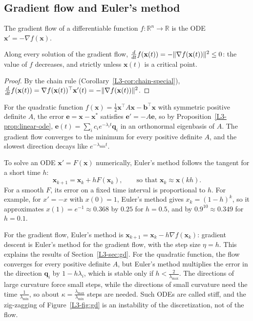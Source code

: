 \subsection{Gradient flow and Euler's method}\label{L3-sec:euler}

\begin{definition}\label{L3-def:gradient-flow}
    The gradient flow of a differentiable function $f: \mathbb{R}^n \to \mathbb{R}$ is the ODE $\mathbf{x}' = -\nabla f(\mathbf{x})$.
\end{definition}

\begin{proposition}\label{L3-prop:gradient-flow}
    Along every solution of the gradient flow, $\frac{d}{dt}f(\mathbf{x}(t)) = -\lVert \nabla f(\mathbf{x}(t)) \rVert^2 \leq 0$: the value of $f$ decreases, and strictly unless $\mathbf{x}(t)$ is a critical point.
\end{proposition}

\begin{proof}
    By the chain rule (Corollary~\ref{L3-cor:chain-special}), $\frac{d}{dt}f(\mathbf{x}(t)) = \nabla f(\mathbf{x}(t))^\top\mathbf{x}'(t) = -\lVert \nabla f(\mathbf{x}(t)) \rVert^2$.
\end{proof}

For the quadratic function $f(\mathbf{x}) = \frac{1}{2}\mathbf{x}^\top A\mathbf{x} - \mathbf{b}^\top\mathbf{x}$ with symmetric positive definite $A$, the error $\mathbf{e} = \mathbf{x} - \mathbf{x}^*$ satisfies $\mathbf{e}' = -A\mathbf{e}$, so by Proposition~\ref{L3-prop:linear-ode}, $\mathbf{e}(t) = \sum_i c_ie^{-\lambda_i t}\mathbf{q}_i$ in an orthonormal eigenbasis of $A$. The gradient flow converges to the minimum for every positive definite $A$, and the slowest direction decays like $e^{-\lambda_{\min}t}$.

To solve an ODE $\mathbf{x}' = F(\mathbf{x})$ numerically, Euler's method follows the tangent for a short time $h$:
\[\mathbf{x}_{k+1} = \mathbf{x}_k + hF(\mathbf{x}_k), \qquad \text{so that } \mathbf{x}_k \approx \mathbf{x}(kh).\]
For a smooth $F$, its error on a fixed time interval is proportional to $h$. For example, for $x' = -x$ with $x(0) = 1$, Euler's method gives $x_k = (1 - h)^k$, so it approximates $x(1) = e^{-1} \approx 0.368$ by $0.25$ for $h = 0.5$, and by $0.9^{10} \approx 0.349$ for $h = 0.1$.

For the gradient flow, Euler's method is $\mathbf{x}_{k+1} = \mathbf{x}_k - h\nabla f(\mathbf{x}_k)$: gradient descent is Euler's method for the gradient flow, with the step size $\eta = h$. This explains the results of Section~\ref{L3-sec:gd}. For the quadratic function, the flow converges for every positive definite $A$, but Euler's method multiplies the error in the direction $\mathbf{q}_i$ by $1 - h\lambda_i$, which is stable only if $h < \frac{2}{\lambda_{\max}}$. The directions of large curvature force small steps, while the directions of small curvature need the time $\frac{1}{\lambda_{\min}}$, so about $\kappa = \frac{\lambda_{\max}}{\lambda_{\min}}$ steps are needed. Such ODEs are called stiff, and the zig-zagging of Figure~\ref{L3-fig:gd} is an instability of the discretization, not of the flow.

